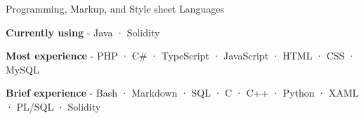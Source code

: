 

\begin{cventries}

  \cventry
    {Programming, Markup, and Style sheet} %
    {Languages} %
    {} %
    {} %
    {
      \begin{cvitems} %
        \item {\textbf{Currently using} \hspace{0.03cm} - \hspace{0.03cm} Java \hspace{0.03cm} · \hspace{0.03cm} Solidity} %
        \item {\textbf{Most experience} \hspace{0.03cm} - \hspace{0.03cm} PHP \hspace{0.03cm} · \hspace{0.03cm} C\# \hspace{0.03cm} · \hspace{0.03cm} TypeScript \hspace{0.03cm} · \hspace{0.03cm} JavaScript \hspace{0.03cm} · \hspace{0.03cm} HTML \hspace{0.03cm} · \hspace{0.03cm} CSS \hspace{0.03cm} · \hspace{0.03cm} MySQL} %
        \item {\textbf{Brief experience} \hspace{0.03cm} - \hspace{0.03cm} Bash \hspace{0.03cm} · \hspace{0.03cm} Markdown \hspace{0.03cm} · \hspace{0.03cm} SQL \hspace{0.03cm} · \hspace{0.03cm} C \hspace{0.03cm} · \hspace{0.03cm} C++ \hspace{0.03cm} · \hspace{0.03cm} Python \hspace{0.03cm} · \hspace{0.03cm} XAML \hspace{0.03cm} · \hspace{0.03cm} PL/SQL \hspace{0.03cm} · \hspace{0.03cm} Solidity \\} %

\end{cvitems}}
\end{cventries}
